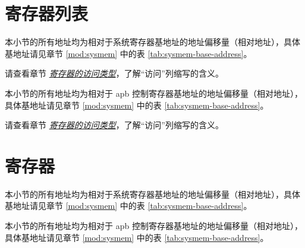 \documentclass[main\_\_CN.tex]{subfiles}
\begin{document}



\clearpage
\section{寄存器列表}
\label{sec:sysreg-reg-summ}
\hypertarget{sysreg-reg-summ}{}

本小节的所有地址均为相对于系统寄存器基地址的地址偏移量（相对地址），具体基地址请见章节 \ref{mod:sysmem} \textit{} 中的表 \ref{tab:sysmem-base-address}。

请查看章节 \hyperref[glossary-access-types]{\textit{寄存器的访问类型}}，了解“访问”列缩写的含义。



\clearpage

本小节的所有地址均为相对于 apb 控制寄存器基地址的地址偏移量（相对地址），具体基地址请见章节 \ref{mod:sysmem} \textit{} 中的表 \ref{tab:sysmem-base-address}。

请查看章节 \hyperref[glossary-access-types]{\textit{寄存器的访问类型}}，了解“访问”列缩写的含义。





\section{寄存器}

本小节的所有地址均为相对于系统寄存器基地址的地址偏移量（相对地址），具体基地址请见章节 \ref{mod:sysmem} \textit{} 中的表 \ref{tab:sysmem-base-address}。



本小节的所有地址均为相对于 apb 控制寄存器基地址的地址偏移量（相对地址），具体基地址请见章节 \ref{mod:sysmem} \textit{} 中的表 \ref{tab:sysmem-base-address}。


\end{document}
